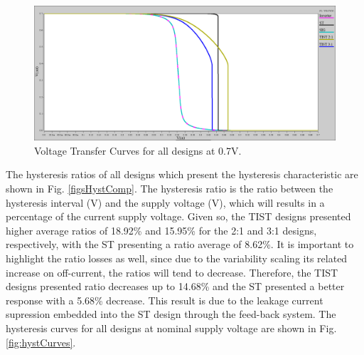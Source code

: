\documentclass[pgmicro,mestrado,english]{iiufrgs}
\begin{document}
        \begin{figure}[]
        \centering
            \includegraphics[width=1\textwidth, trim={0cm 0cm 0cm 0cm}, clip]{vtcs07.png}
            \caption{Voltage Transfer Curves for all designs at 0.7V.}
        \label{fig:vtcs07}
    \end{figure}
    
    The hysteresis ratios of all designs which present the hysteresis characteristic are shown in Fig. \ref{figsHystComp}. The hysteresis ratio is the ratio between the hysteresis interval (V) and the supply voltage (V), which will results in a percentage of the current supply voltage. Given so, the TIST designs presented higher average ratios of 18.92\% and 15.95\% for the 2:1 and 3:1 designs, respectively, with the ST presenting a ratio average of 8.62\%. It is important to highlight the ratio losses as well, since due to the variability scaling its related increase on off-current, the ratios will tend to decrease. Therefore, the TIST designs presented ratio decreases up to 14.68\% and the ST presented a better response with a 5.68\% decrease. This result is due to the leakage current supression embedded into the ST design through the feed-back system. The hysteresis curves for all designs at nominal supply voltage are shown in Fig. \ref{fig:hystCurves}.
    
\end{document}

